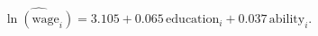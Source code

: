 \[
\widehat{\ln(\mathrm{wage}_i)} = 3.105 + 0.065\,\mathrm{education}_i + 0.037\,\mathrm{ability}_i.
\]
